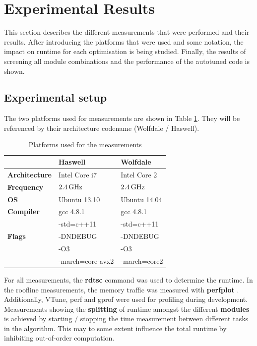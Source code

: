 \documentclass[letterpaper]{article}
\begin{document}
\section{Experimental Results}\label{sec:exp}
This section describes the different measurements that were performed and their results. After introducing the platforms that were used and some notation, the impact on runtime for each optimisation is being studied. Finally, the results of screening all module combinations and the performance of the autotuned code is shown.
\subsection{Experimental setup} \label{exp:setup}
The two platforms used for measurements are shown in Table \ref{platforms}. They will be referenced by their architecture codename (Wolfdale / Haswell).
\begin{table}[h]
\begin{tabular}{lll}
 & \textbf{Haswell} & \textbf{Wolfdale}\\\hline
\textbf{Architecture} & Intel Core i7 & Intel Core 2\\\hline
\textbf{Frequency} & $\unit[2.4]{GHz}$ & $\unit[2.4]{GHz}$\\\hline
\textbf{OS} & Ubuntu 13.10 & Ubuntu 14.04\\\hline
\textbf{Compiler} & gcc 4.8.1 & gcc 4.8.1\\\hline
 & -std=c++11  & -std=c++11  \\
\textbf{Flags}& -DNDEBUG & -DNDEBUG \\
& -O3  &  -O3 \\
& -march=core-avx2 & -march=core2 \\
\end{tabular}
\caption{Platforms used for the measurements}
\label{platforms}
\end{table}
\newline For all measurements, the \textbf{rdtsc} command was used to determine the runtime. In the roofline measurements, the memory traffic was measured with \textbf{perfplot} \cite{PERFPLOT}. Additionally, VTune, perf and gprof were used for profiling during development.\newline
Measurements showing the \textbf{splitting} of runtime amongst the different \textbf{modules} is achieved by starting / stopping the time measurement between different tasks in the algorithm. This may to some extent influence the total runtime by inhibiting out-of-order computation.\newline
\end{document}
